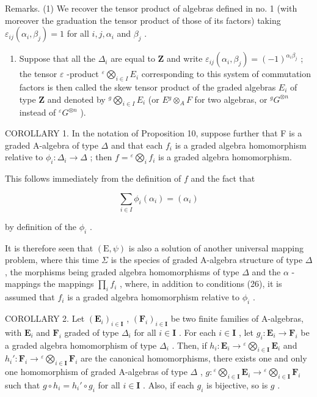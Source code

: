 Remarks. (1) We recover the tensor product of algebras defined in no. 1 (with moreover the graduation the tensor product of those of its factors) taking \(\varepsilon_{ij}(\alpha_i, \beta_j) = 1\) for all \(i, j, \alpha_i\) and \(\beta_j\) .

\begin{enumerate}
\def\labelenumi{(\arabic{enumi})}
\setcounter{enumi}{1}
\tightlist
\item
  Suppose that all the \(\Delta_{i}\) are equal to \(\mathbf{Z}\) and write \(\varepsilon_{ij}(\alpha_i, \beta_j) = (-1)^{\alpha_i \beta_j}\) ; the tensor \(\varepsilon\) -product \({}^{\varepsilon}\bigotimes_{i \in I} E_i\) corresponding to this system of commutation factors is then called the skew tensor product of the graded algebras \(E_i\) of type \(\mathbf{Z}\) and denoted by \({}^{g}\bigotimes_{i \in I} E_i\) (or \(E{}^{g} \otimes_A F\) for two algebras, or \({}^{g} G^{\otimes n}\) instead of \({}^{\varepsilon} G^{\otimes n}\) ).
\end{enumerate}

COROLLARY 1. In the notation of Proposition 10, suppose further that F is a graded A-algebra of type \(\Delta\) and that each \(f_{i}\) is a graded algebra homomorphism relative to \(\phi_{i}:\Delta_{i}\to\Delta\) ; then \(f={}^{\varepsilon}\bigotimes_{i}f_{i}\) is a graded algebra homomorphism.

This follows immediately from the definition of \(f\) and the fact that

\[
\sum_ {i \in I} \phi_ {i} (\alpha_ {i}) = (\alpha_ {i})
\]

by definition of the \(\phi_{i}\) .

It is therefore seen that \((\mathrm{E},\psi)\) is also a solution of another universal mapping problem, where this time \(\Sigma\) is the species of graded A-algebra structure of type \(\Delta\) , the morphisms being graded algebra homomorphisms of type \(\Delta\) and the \(\alpha\) -mappings the mappings \(\prod_{i}f_{i}\) , where, in addition to conditions (26), it is assumed that \(f_{i}\) is a graded algebra homomorphism relative to \(\phi_{i}\) .

COROLLARY 2. Let \((\mathbf{E}_i)_{i\in \mathbf{I}}\) , \((\mathbf{F}_i)_{i\in \mathbf{I}}\) be two finite families of A-algebras, with \(\mathbf{E}_i\) and \(\mathbf{F}_i\) graded of type \(\Delta_i\) for all \(i\in \mathbf{I}\) . For each \(i\in \mathbf{I}\) , let \(g_i:\mathbf{E}_i\to \mathbf{F}_i\) be a graded algebra homomorphism of type \(\Delta_i\) . Then, if \(h_i:\mathbf{E}_i\to {}^{\varepsilon}\bigotimes_{i\in \mathbf{I}}\mathbf{E}_i\) and \(h_i':\mathbf{F}_i\to {}^{\varepsilon}\bigotimes_{i\in \mathbf{I}}\mathbf{F}_i\) are the canonical homomorphisms, there exists one and only one homomorphism of graded A-algebras of type \(\Delta\) , \(g: {}^{\varepsilon}\bigotimes_{i\in \mathbf{I}}\mathbf{E}_i\to {}^{\varepsilon}\bigotimes_{i\in \mathbf{I}}\mathbf{F}_i\) such that \(g\circ h_i = h_i'\circ g_i\) for all \(i\in \mathbf{I}\) . Also, if each \(g_i\) is bijective, so is \(g\) .

